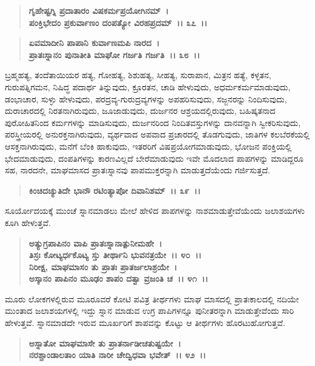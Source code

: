 \begin{verse}
\textbf{ಗೃಹೇಷ್ಟಗ್ನಿ ಪ್ರದಾತಾರಂ ವಿಷಕರ್ಮಪ್ರಯೋಗಿನಮ್~।}\\\textbf{ಪಂಕ್ತಿಭೇದಂ ಪ್ರಕುರ್ವಾಣಂ ದಂಪತ್ಯೋ ವಿರಹಪ್ರದಮ್~।। ೩೭~।।}
\end{verse}

\begin{verse}
\textbf{ಏವಮಾದೀನಿ ಪಾಪಾನಿ ಕುರ್ವಾಣಮಪಿ ನಾರದ~।}\\\textbf{ಪ್ರಾತಃಸ್ನಾನಂ ಪುನಾತೀತಿ ಮಾಘೋ ಗರ್ಜತಿ ಗರ್ಜತಿ~।। ೩೮~।।}
\end{verse}

ಬ್ರಹ್ಮಹತ್ಯ, ತಂದೆತಾಯಿಯರ ಹತ್ಯ, ಗೋಹತ್ಯ, ಶಿಶುಹತ್ಯ, ಸೀಹತ್ಯ, ಸುರಾಪಾನ, ಮಿತ್ರನ ಹತ್ಯೆ, ಕಳ್ಳತನ, ಗುರುಪತ್ನಿಗಮನ, ನಿಷಿದ್ಧ ಪದಾರ್ಥ ತಿನ್ನುವುದು, ಕ್ರೂರತನ, ಚಾಡಿ ಹೇಳುವುದು, ಅಧರ್ಮಕರ್ಮಮಾಡುವುದು, ಡಂಭಾಚಾರ, ಸುಳ್ಳು ಹೇಳುವುದು, ಪರದ್ರವ್ಯ-ಗುರುದ್ರವ್ಯಗಳನ್ನು ಅಪಹರಿಸುವುದು, ಸಜ್ಜನರನ್ನು ನಿಂದಿಸುವುದು, ದುರಾಚಾರದಲ್ಲಿ ನಿರತನಾಗಿರುವುದು, ಜೂಜಾಡುವುದು, ದುರ್ಜನರ ಆಶ್ರಯದಲ್ಲಿರುವುದು, ಬಹಿಷ್ಕತನಾದ ಪುರೋಹಿತನಿಂದ ಕರ್ಮಗಳನ್ನು ಮಾಡಿಸುವುದು, ದುರ್ಜನರಿಂದ ನಿಂದಿತವಸ್ತುಗಳನ್ನು ದಾನವನ್ನಾಗಿ ಸ್ವೀಕರಿಸುವುದು, ಪರಸ್ತ್ರೀಯರಲ್ಲಿ ಅನುರಕ್ತನಾಗಿರುವುದು, ವ್ಯರ್ಥವಾದ ಅಪವಾದ ಪ್ರಚಾರದಲ್ಲಿ ತೊಡಗುವುದು, ಜಾತಿಗಳ ಕಲಬೆರಕೆಯಲ್ಲಿ ಆಸಕ್ತನಾಗಿರುವುದು, ಮನೆಗೆ ಬೆಂಕಿ ಹಾಕುವುದು, ಇತರರಿಗೆ ವಿಷಪ್ರಯೋಗಮಾಡುವುದು, ಭೋಜನ ಪಂಕ್ತಿಯಲ್ಲಿ ಭೇದಮಾಡುವುದು, ದಂಪತಿಗಳನ್ನು ಕಾರಣವಿಲ್ಲದೆ ಬೇರೆಮಾಡುವುದು ಇವೇ ಮೊದಲಾದ ಪಾಪಗಳನ್ನು ಮಾಡಿದ್ದರೂ ಸಹ, ನಾರದನೇ, ಮಾಘಮಾಸದ ಪ್ರಾತಃಸ್ನಾನವು ಪಾಪಮುಕ್ತರನ್ನಾಗಿ ಮಾಡುತ್ತದೆಯೆಂದು ಗರ್ಜಿಸುತ್ತದೆ.

\begin{verse}
\textbf{ಕಿಂಚಿದಚ್ಯುತಿದೇ ಭಾನೌ ರಟಿಂತ್ಯಾಪೋ ದಿವಾನಿಶಮ್~।। ೩೯~।।}
\end{verse}

ಸೂರ್ಯೋದಯಕ್ಕೆ ಮುಂಚೆ ಸ್ನಾನಮಾಡಲು ಮೇಲೆ ಹೇಳಿದ ಪಾಪಗಳನ್ನು ನಾಶಮಾಡುತ್ತೇವೆಯೆಂದು ಜಲಾಶಯಗಳು ಕೂಗಿ ಹೇಳುತ್ತವೆ.

\begin{verse}
\textbf{ಅತ್ಯುಗ್ರಪಾಪಿನಂ ವಾಪಿ ಪ್ರಾತಃಸ್ನಾನಾತ್ಪುನೀಮಹೇ~।}\\\textbf{ತಿಸ್ರಃ ಕೋಟ್ಯರ್ಧಕೊಟ್ಯ ಸ್ತು ತೀರ್ಥಾನಿ ಭುವನತ್ರಯೇ~।। ೪೦~।।}\\\textbf{ನಿರೀಕ್ಷ, ಮಾಘಮಾಸಂ ತು ಪ್ರಾತಃ ಪ್ರಾತರ್ಜಲಾಶ್ರಯೇ~।}\\\textbf{ಅಸ್ಕಾನಂ ಪಾಪಿನಂ ಮೂಢಂ ಶಾಪಂ ದತ್ವಾ ವ್ರಜಂತಿ ಚ~।। ೪೧~।।}
\end{verse}

ಮೂರು ಲೋಕಗಳಲ್ಲಿರುವ ಮೂರೂವರೆ ಕೋಟಿ ಪವಿತ್ರ ತೀರ್ಥಗಳು ಮಾಘ ಮಾಸದಲ್ಲಿ ಪ್ರಾತಃಕಾಲದಲ್ಲಿ ನದಿಯೇ ಮುಂತಾದ ಜಲಾಶಯಗಳಲ್ಲಿ ಇದ್ದು ಸ್ನಾನ ಮಾಡುವ ಉಗ್ರ ಪಾಪಿಗಳನ್ನೂ ಪುನೀತರನ್ನಾಗಿ ಮಾಡುತ್ತೇವೆಂದು ಸಾರಿ ಹೇಳುತ್ತವೆ. ಸ್ನಾನಮಾಡದೇ ಇರುವ ಮೂರ್ಖರಿಗೆ ಶಾಪವನ್ನು ಕೊಟ್ಟು ಆ ತೀರ್ಥಗಳು ಹೊರಟುಹೋಗುತ್ತವೆ.

\begin{verse}
\textbf{ಅಸ್ನಾತೋ ಮಾಘಮಾಸೇ ತು ಪ್ರಾತರ್ನಾಡೀಚತುಷ್ಟಯೇ~।}\\\textbf{ನರಶ್ಚಾಂಡಾಲತಾಂ ಯಾತಿ ನಾರೀ ಚೇದ್ವಿಧವಾ ಭವೇತ್~।। ೪೨~।।}
\end{verse}

